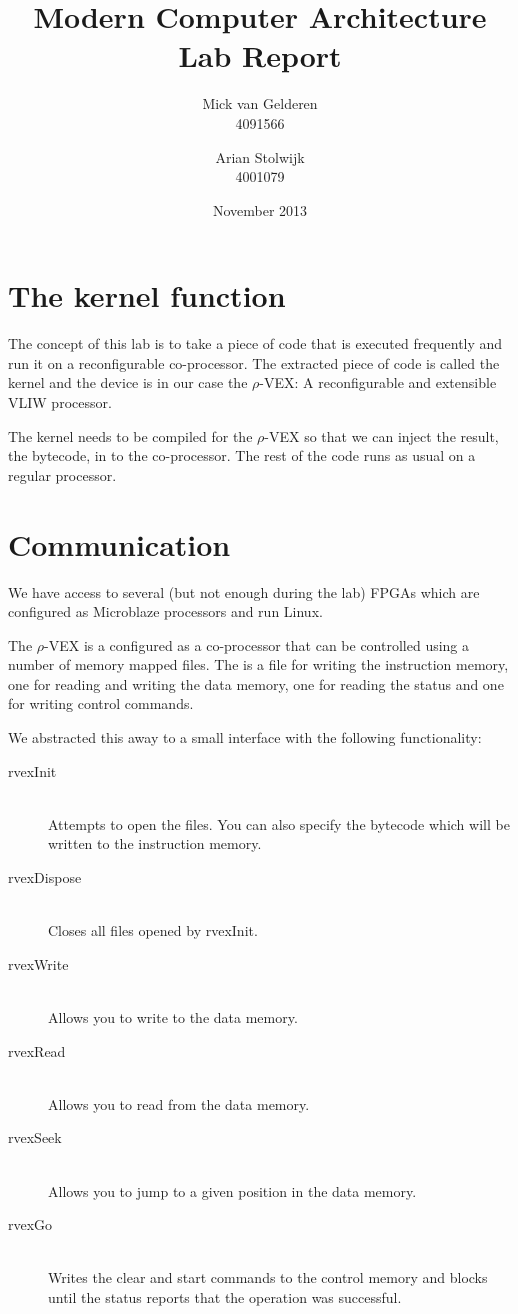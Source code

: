 \documentclass{article}
\title{Modern Computer Architecture\\Lab Report}
\author{%
    Mick van Gelderen\\4091566
    \and
    Arian Stolwijk\\4001079
}
\date{November 2013}
\newcommand{\rvex}{\ensuremath{\rho}-VEX}
\begin{document}
\maketitle



\section{The kernel function}

The concept of this lab is to take a piece of code that is executed frequently
and run it on a reconfigurable co-processor.  The extracted piece of code is
called the kernel and the device is in our case the \rvex{}: A reconfigurable
and extensible VLIW processor.

The kernel needs to be compiled for the \rvex{} so that we can inject the
result, the bytecode, in to the co-processor. The rest of the code runs as
usual on a regular processor.

\section{Communication}

We have access to several (but not enough during the lab) FPGAs which are
configured as Microblaze processors and run Linux.

The \rvex{} is a configured as a co-processor that can be controlled using a
number of memory mapped files. The is a file for writing the instruction
memory, one for reading and writing the data memory, one for reading the status
and one for writing control commands.

We abstracted this away to a small interface with the following functionality:

\begin{description}
    \item[rvexInit] \hfill \\
        Attempts to open the files. You can also specify the bytecode which
        will be written to the instruction memory.
    \item[rvexDispose] \hfill \\
        Closes all files opened by rvexInit.
    \item[rvexWrite] \hfill \\
        Allows you to write to the data memory.
    \item[rvexRead] \hfill \\
        Allows you to read from the data memory.
    \item[rvexSeek] \hfill \\
        Allows you to jump to a given position in the data memory.
    \item[rvexGo] \hfill \\
        Writes the clear and start commands to the control memory and blocks
        until the status reports that the operation was successful.
\end{description}
\end{document}
